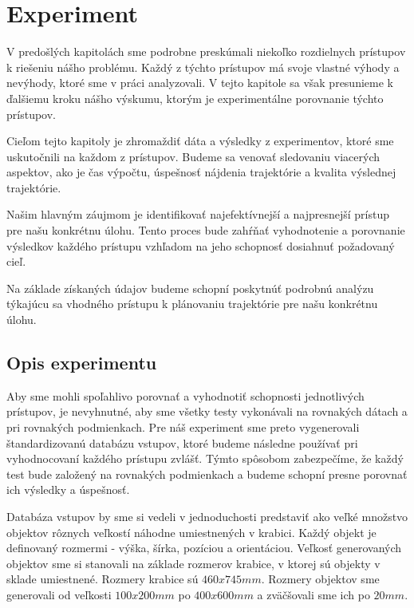 \section{Experiment}
\label{kap:5}

V predošlých kapitolách sme podrobne preskúmali niekoľko rozdielnych prístupov k riešeniu nášho problému. Každý z týchto prístupov má svoje vlastné výhody a nevýhody, ktoré sme v práci analyzovali. V tejto kapitole sa však presunieme k ďalšiemu kroku nášho výskumu, ktorým je experimentálne porovnanie týchto prístupov.

Cieľom tejto kapitoly je zhromaždiť dáta a výsledky z experimentov, ktoré sme uskutočnili na každom z prístupov. Budeme sa venovať sledovaniu viacerých aspektov, ako je čas výpočtu, úspešnosť nájdenia trajektórie a kvalita výslednej trajektórie.

Našim hlavným záujmom je identifikovať najefektívnejší a najpresnejší prístup pre našu konkrétnu úlohu. Tento proces bude zahŕňať vyhodnotenie a porovnanie výsledkov každého prístupu vzhľadom na jeho schopnosť dosiahnuť požadovaný cieľ.

Na základe získaných údajov budeme schopní poskytnúť podrobnú analýzu týkajúcu sa vhodného prístupu k plánovaniu trajektórie pre našu konkrétnu úlohu.

\subsection{Opis experimentu}

Aby sme mohli spoľahlivo porovnať a vyhodnotiť schopnosti jednotlivých prístupov, je nevyhnutné, aby sme všetky testy vykonávali na rovnakých dátach a pri rovnakých podmienkach. Pre náš experiment sme preto vygenerovali štandardizovanú databázu vstupov, ktoré budeme následne používať pri vyhodnocovaní každého prístupu zvlášť. Týmto spôsobom zabezpečíme, že každý test bude založený na rovnakých podmienkach a budeme schopní presne porovnať ich výsledky a úspešnosť.

Databáza vstupov by sme si vedeli v jednoduchosti predstaviť ako veľké množstvo objektov rôznych veľkostí náhodne umiestnených v krabici. Každý objekt je definovaný rozmermi - výška, šírka, pozíciou a orientáciou. Veľkosť generovaných objektov sme si stanovali na základe rozmerov krabice, v ktorej sú objekty v sklade umiestnené. Rozmery krabice sú $ 460x745 mm $. Rozmery objektov sme generovali od veľkosti $ 100x200 mm $ po $ 400x600 mm $  a  zväčšovali sme ich po $ 20mm $. 

